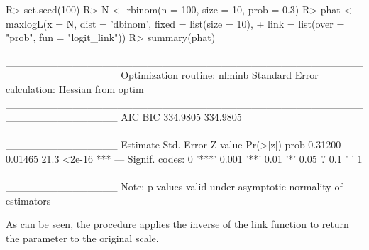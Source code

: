 \documentclass[nojss]{jss}
\begin{document}
\begin{Schunk}
\begin{Sinput}
R> set.seed(100)
R> N <- rbinom(n = 100, size = 10, prob = 0.3)
R> phat <- maxlogL(x = N, dist = 'dbinom', fixed = list(size = 10),
+                  link = list(over = "prob", fun = "logit_link"))
R> summary(phat)
\end{Sinput}
\begin{Soutput}
_______________________________________________________________
Optimization routine: nlminb 
Standard Error calculation: Hessian from optim 
_______________________________________________________________
       AIC      BIC
  334.9805 334.9805
_______________________________________________________________
     Estimate  Std. Error Z value Pr(>|z|)    
prob   0.31200    0.01465    21.3   <2e-16 ***
---
Signif. codes:  0 '***' 0.001 '**' 0.01 '*' 0.05 '.' 0.1 ' ' 1
_______________________________________________________________
Note: p-values valid under asymptotic normality of estimators 
---
\end{Soutput}
\end{Schunk}

As can be seen, the procedure applies the inverse of the link function to return the parameter to the original scale.

%
%
\end{document}
